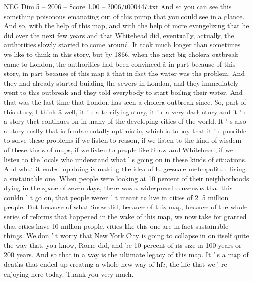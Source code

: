 \begin{textsample}{NEG Dim 5 – 2006 – Score 1.00 – 2006/t000447.txt}
And so you can see this something poisonous emanating out of this pump that you could see in a glance.
And so, with the help of this map, and with the help of more evangelizing that he did over the next few years and that Whitehead did, eventually, actually, the authorities slowly started to come around.
It took much longer than sometimes we like to think in this story, but by 1866, when the next big cholera outbreak came to London, the authorities had been convinced â in part because of this story, in part because of this map â that in fact the water was the problem.
And they had already started building the sewers in London, and they immediately went to this outbreak and they told everybody to start boiling their water.
And that was the last time that London has seen a cholera outbreak since.
So, part of this story, I think â well, it ' s a terrifying story, it ' s a very dark story and it ' s a story that continues on in many of the developing cities of the world.
It ' s also a story really that is fundamentally optimistic, which is to say that it ' s possible to solve these problems if we listen to reason, if we listen to the kind of wisdom of these kinds of maps, if we listen to people like Snow and Whitehead, if we listen to the locals who understand what ' s going on in these kinds of situations.
And what it ended up doing is making the idea of large-scale metropolitan living a sustainable one.
When people were looking at 10 percent of their neighborhoods dying in the space of seven days, there was a widespread consensus that this couldn ' t go on, that people weren ' t meant to live in cities of 2. 5 million people.
But because of what Snow did, because of this map, because of the whole series of reforms that happened in the wake of this map, we now take for granted that cities have 10 million people, cities like this one are in fact sustainable things.
We don ' t worry that New York City is going to collapse in on itself quite the way that, you know, Rome did, and be 10 percent of its size in 100 years or 200 years.
And so that in a way is the ultimate legacy of this map.
It ' s a map of deaths that ended up creating a whole new way of life, the life that we ' re enjoying here today.
Thank you very much.

\end{textsample}
